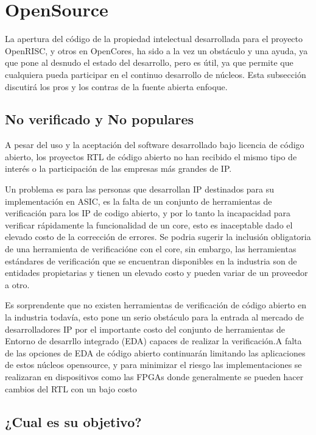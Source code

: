 \section{ OpenSource}

La apertura del código de la propiedad intelectual desarrollada para el proyecto OpenRISC, y otros en OpenCores, ha sido a la vez un obstáculo y una ayuda, ya que pone al desnudo el estado del desarrollo, pero es útil, ya que permite que cualquiera pueda participar en el continuo desarrollo de núcleos. Esta subsección discutirá los pros y los contras de la fuente abierta enfoque.

		\subsection{No verificado y No populares}

A pesar del uso y la aceptación del software desarrollado bajo licencia de código abierto, los proyectos RTL de código abierto no han recibido el mismo tipo de interés o la participación de las empresas más grandes de IP. 

Un problema es para las personas que desarrollan IP destinados para su implementación en ASIC, es la falta de un conjunto de herramientas de verificación para los IP de codigo abierto, y por lo tanto la incapacidad para verificar rápidamente la funcionalidad de un core, esto es inaceptable dado el elevado costo de la corrección de errores. Se podria sugerir la inclusión obligatoria de una herramienta de verificacióne con el core, sin embargo, las herramientas estándares de verificación que se encuentran disponibles en la industria son de entidades propietarias y tienen un elevado costo y pueden variar de un proveedor a otro. 

Es sorprendente que no existen herramientas de verificación de código abierto en la industria todavía, esto pone un serio obstáculo para la entrada al mercado de desarrolladores IP por el importante costo del conjunto de herramientas de Entorno de desarrllo integrado (EDA) capaces de realizar la verificación.A falta de las opciones de EDA de código abierto continuarán limitando las aplicaciones de estos núcleos opensource, y para minimizar el riesgo las implementaciones se realizaran en dispositivos como las FPGAs donde generalmente se pueden hacer cambios  del RTL con un bajo costo 
 

	\subsection{¿Cual es su objetivo? }


